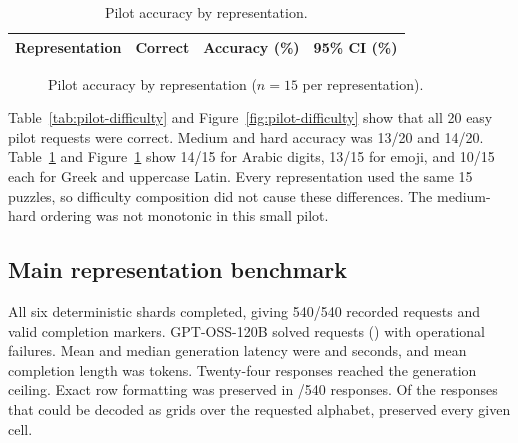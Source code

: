 \documentclass[11pt,a4paper]{article}
\begin{document}
\begin{table}[H]
\centering
\caption{Pilot accuracy by representation.}
\label{tab:pilot-representation}
\begin{tabular}{lrrr}
\toprule
Representation & Correct & Accuracy (\%) & 95\% CI (\%) \\
\midrule
%
\end{tabular}
\end{table}

\begin{figure}[H]
\centering
{}
\caption{Pilot accuracy by representation ($n=15$ per representation).}
\label{fig:pilot-representation}
\end{figure}

Table~\ref{tab:pilot-difficulty} and Figure~\ref{fig:pilot-difficulty} show that all 20 easy pilot requests were correct. Medium and hard accuracy was 13/20 and 14/20. Table~\ref{tab:pilot-representation} and Figure~\ref{fig:pilot-representation} show 14/15 for Arabic digits, 13/15 for emoji, and 10/15 each for Greek and uppercase Latin. Every representation used the same 15 puzzles, so difficulty composition did not cause these differences. The medium-hard ordering was not monotonic in this small pilot.

\subsection{Main representation benchmark}
All six deterministic shards completed, giving 540/540 recorded requests and valid completion markers. GPT-OSS-120B solved \MainCorrect{} requests (\MainAccuracy{}) with \MainOperationalFailures{} operational failures. Mean and median generation latency were \MainMeanLatency{} and \MainMedianLatency{} seconds, and mean completion length was \MainMeanTokens{} tokens. Twenty-four responses reached the generation ceiling. Exact row formatting was preserved in \MainFormatCompliant{}/540 responses. Of the \MainParseable{} responses that could be decoded as grids over the requested alphabet, \MainCluesPreserved{} preserved every given cell.
\end{document}
